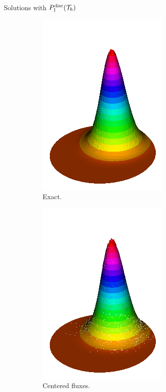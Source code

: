 		\begin{frame}{Solutions with $\relax{P}^{\text{disc}}_1(\mathcal{T}_h)$}
		\begin{figure}[h!]
			\vspace{-0.2cm}
			\begin{subfigure}[b]{0.27\textwidth}
				\centering
				\includegraphics[scale=0.18]{img/Conveccion_Reaccion/Recortes/steady_convect_react_exact_n_128.png}
				\caption{Exact.}
			\end{subfigure}
			\begin{subfigure}[b]{0.27\textwidth}
				\centering
				\includegraphics[scale=0.18]{img/Conveccion_Reaccion/Recortes/steady_convect_react_approx_CF_n_128.png}
				\caption{Centered fluxes.}
			\end{subfigure}
			\begin{subfigure}[b]{0.27\textwidth}

\end{subfigure}
\end{figure}
\end{frame}
